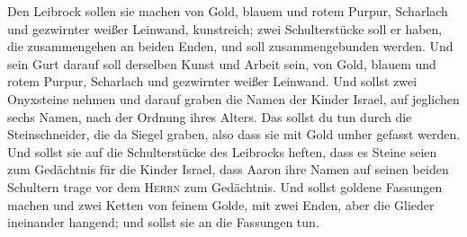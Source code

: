  Den Leibrock sollen sie machen von Gold, blauem und rotem
Purpur, Scharlach und gezwirnter weißer Leinwand, kunstreich;
 zwei Schulterstücke soll er haben, die zusammengehen an
beiden Enden, und soll zusammengebunden werden.  Und sein
Gurt darauf soll derselben Kunst und Arbeit sein, von Gold, blauem und
rotem Purpur, Scharlach und gezwirnter weißer Leinwand. 
Und sollst zwei Onyxsteine nehmen und darauf graben die Namen der Kinder
Israel,  auf jeglichen sechs Namen, nach der Ordnung
ihres Alters.  Das sollst du tun durch die
Steinschneider, die da Siegel graben, also dass sie mit Gold umher
gefasst werden.  Und sollst sie auf die Schulterstücke
des Leibrocks heften, dass es Steine seien zum Gedächtnis für die Kinder
Israel, dass Aaron ihre Namen auf seinen beiden Schultern trage vor dem
\textsc{Herrn} zum Gedächtnis.  Und sollst goldene
Fassungen machen  und zwei Ketten von feinem Golde, mit
zwei Enden, aber die Glieder ineinander hangend; und sollst sie an die
Fassungen tun.

